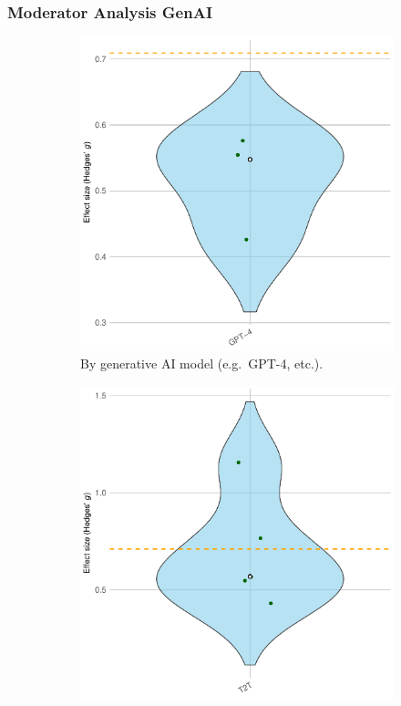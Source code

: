 \documentclass[manuscript, screen, review, acmsmall, anonymous]{acmart}
\begin{document}
\subsubsection{Moderator Analysis GenAI}
\label{sec:CreativeDiversity_Moderator_GenAI}
\begin{figure}[H]
  \centering
  \begin{subfigure}[t]{0.49\linewidth}
    \centering
    \includegraphics[width=\linewidth]{plot_diversity_raw_violin_GenAI_Model}
    \caption{By generative AI model (e.g.\ GPT-4, etc.).}
    \label{fig:diversity_raw_violin_genai_model}
  \end{subfigure}%
  \hfill
  \begin{subfigure}[t]{0.49\linewidth}
    \centering
    \includegraphics[width=\linewidth]{plot_diversity_raw_violin_GenAI_Type}

\end{subfigure}
\end{figure}
\end{document}
